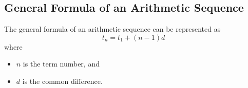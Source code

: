 \subsection{General Formula of an Arithmetic Sequence}

The general formula of an arithmetic sequence can be represented as \[ t_n = t_1 + (n-1)d \] where 
\begin{itemize}
  \item $n$ is the term number, and
  \item $d$ is the common difference.
\end{itemize}